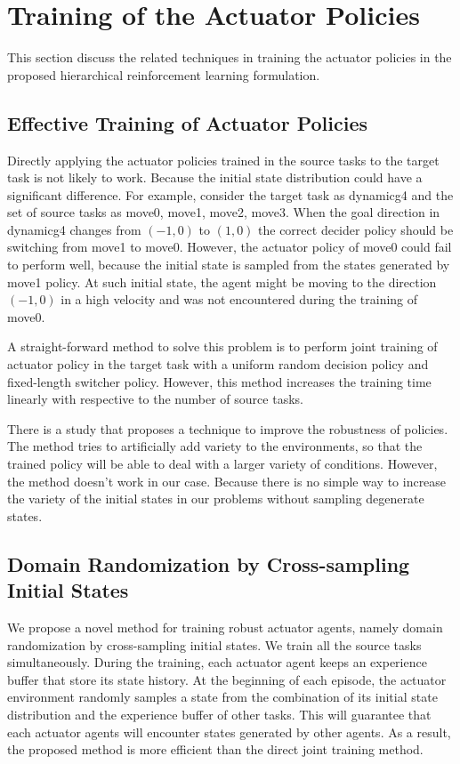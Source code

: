 \section{Training of the Actuator Policies}
This section discuss the related techniques in training the actuator policies in the proposed hierarchical reinforcement learning formulation.
\subsection{Effective Training of Actuator Policies}
Directly applying the actuator policies trained in the source tasks to the target task is not likely to work. Because the initial state distribution could have a significant difference.
For example, consider the target task as dynamicg4 and the set of source tasks as move0, move1, move2, move3. When the goal direction in dynamicg4 changes from $(-1,0)$ to $(1,0)$ the correct decider policy should be switching from move1 to move0. However, the actuator policy of move0 could fail to perform well, because the initial state is sampled from the states generated by move1 policy. At such initial state, the agent might be moving to the direction $(-1,0)$ in a high velocity and was not encountered during the training of move0.

A straight-forward method to solve this problem is to perform joint training of actuator policy in the target task with a uniform random decision policy and fixed-length switcher policy. However, this method increases the training time linearly with respective to the number of source tasks.

There is a study \cite{tobin2017domain} that proposes a technique to improve the robustness of policies. The method tries to artificially add variety to the environments, so that the trained policy will be able to deal with a larger variety of conditions. However, the method doesn't work in our case. Because there is no simple way to increase the variety of the initial states in our problems without sampling degenerate states. 

\subsection{Domain Randomization by Cross-sampling Initial States}
We propose a novel method for training robust actuator agents, namely domain randomization by cross-sampling initial states. We train all the source tasks simultaneously. During the training, each actuator agent keeps an experience buffer that store its state history. At the beginning of each episode, the actuator environment randomly samples a state from the combination of its initial state distribution and the experience buffer of other tasks. This will guarantee that each actuator agents will encounter states generated by other agents. As a result, the proposed method is more efficient than the direct joint training method.

